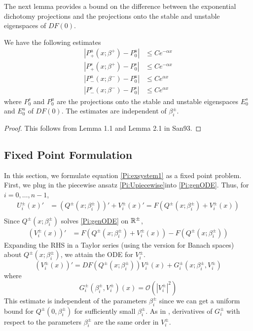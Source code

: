\documentclass[thesis.tex]{subfiles}
\begin{document}
The next lemma provides a bound on the difference between the exponential dichotomy projections and the projections onto the stable and unstable eigenspaces of $DF(0)$.


\begin{lemma}\label{projdifflemma}
We have the following estimates
\begin{equation}\label{projdiffest}
\begin{aligned}
|P^u_+(x; \beta^+) - P_0^u| &\leq C e^{-\alpha x} \\
|P^s_+(x; \beta^+) - P_0^s| &\leq C e^{-\alpha x} \\
|P^u_-(x; \beta^-) - P_0^u| &\leq C e^{\alpha x} \\
|P^s_-(x; \beta^-) - P_0^s| &\leq C e^{\alpha x} 
\end{aligned}
\end{equation}
where $P_0^s$ and $P_0^u$ are the projections onto the stable and unstable eigenspaces $E_0^s$ and $E_0^u$ of $DF(0)$. The estimates are independent of $\beta_i^\pm$.
\begin{proof}
This follows from Lemma 1.1 and Lemma 2.1 in San93.
\end{proof}
\end{lemma}

\subsection{Fixed Point Formulation}

In this section, we formulate equation \eqref{Pi:exsystem1} as a fixed point problem. First, we plug in the piecewise ansatz \eqref{Pi:Upiecewise}into \eqref{Pi:genODE}. Thus, for $i = 0, \dots, n-1$, 
\begin{align*}
U_i^\pm(x)' &= (Q^\pm(x; \beta_i^\pm))' + V_i^\pm(x)' = F\left(Q^\pm(x; \beta_i^\pm) + V_i^\pm(x) \right) \\
\end{align*}
Since $Q^\pm(x; \beta_i^\pm)$ solves \eqref{Pi:genODE} on ${\mathbb R}^\pm$, 
\begin{align*}
(V_i^\pm(x))' &= F\left(Q^\pm(x; \beta_i^\pm) + V_i^\pm(x) \right) - F(Q^\pm(x; \beta_i^\pm))
\end{align*}
Expanding the RHS in a Taylor series (using the version for Banach spaces) about $Q^\pm(x; \beta_i^\pm)$, we attain the ODE for $V_i^\pm$.
\begin{equation}\label{Vpiecewise}
(V_i^\pm(x))' = DF(Q^\pm(x; \beta_i^\pm)) V_i^\pm(x) + G_i^\pm(x; \beta_i^\pm, V_i^\pm)
\end{equation}
where 
\begin{equation}\label{Gquadratic}
G_i^\pm(\beta_i^\pm, V_i^\pm)(x) = \mathcal{O}(|V_i^\pm|^2)
\end{equation}
This estimate is independent of the parameters $\beta_i^\pm$ since we can get a uniform bound for $Q^\pm(0, \beta_i^\pm)$ for sufficiently small $\beta_i^\pm$. As in \cite{Sandstede1997}, derivatives of $G_i^\pm$ with respect to the parameters $\beta_i^\pm$ are the same order in $V_i^\pm$.
\end{document}
